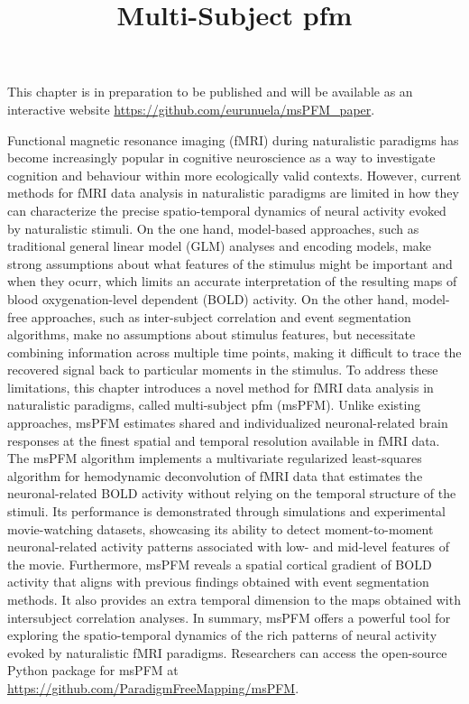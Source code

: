 \title{Multi-Subject \acrlong*{pfm}}
\label{cha:multi-subject}

\begin{framed}\noindent This chapter is in preparation to be published and will
    be available as an interactive website
    \url{https://github.com/eurunuela/msPFM\_paper}.
\end{framed}

Functional magnetic resonance imaging (fMRI) during naturalistic paradigms has
become increasingly popular in cognitive neuroscience as a way to investigate
cognition and behaviour within more ecologically valid contexts. However,
current methods for fMRI data analysis in naturalistic paradigms are limited in
how they can characterize the precise spatio-temporal dynamics of neural
activity evoked by naturalistic stimuli. On the one hand, model-based
approaches, such as traditional general linear model (GLM) analyses and encoding
models, make strong assumptions about what features of the stimulus might be
important and when they ocurr, which limits an accurate interpretation of the
resulting maps of blood oxygenation-level dependent (BOLD) activity. On the
other hand, model-free approaches, such as inter-subject correlation and event
segmentation algorithms, make no assumptions about stimulus features, but
necessitate combining information across multiple time points, making it
difficult to trace the recovered signal back to particular moments in the
stimulus. To address these limitations, this chapter introduces a novel method
for fMRI data analysis in naturalistic paradigms, called multi-subject
\acrlong*{pfm} (msPFM). Unlike existing approaches, msPFM estimates shared and
individualized neuronal-related brain responses at the finest spatial and
temporal resolution available in fMRI data. The msPFM algorithm implements a
multivariate regularized least-squares algorithm for hemodynamic deconvolution
of fMRI data that estimates the neuronal-related BOLD activity without relying
on the temporal structure of the stimuli. Its performance is demonstrated
through simulations and experimental movie-watching datasets, showcasing its
ability to detect moment-to-moment neuronal-related activity patterns associated
with low- and mid-level features of the movie. Furthermore, msPFM reveals a
spatial cortical gradient of BOLD activity that aligns with previous findings
obtained with event segmentation methods. It also provides an extra temporal
dimension to the maps obtained with intersubject correlation analyses.  
In summary, msPFM offers a powerful tool for exploring the spatio-temporal 
dynamics of the rich patterns of neural activity evoked by naturalistic fMRI paradigms. 
Researchers can access the open-source Python package for msPFM at
\url{https://github.com/ParadigmFreeMapping/msPFM}.


